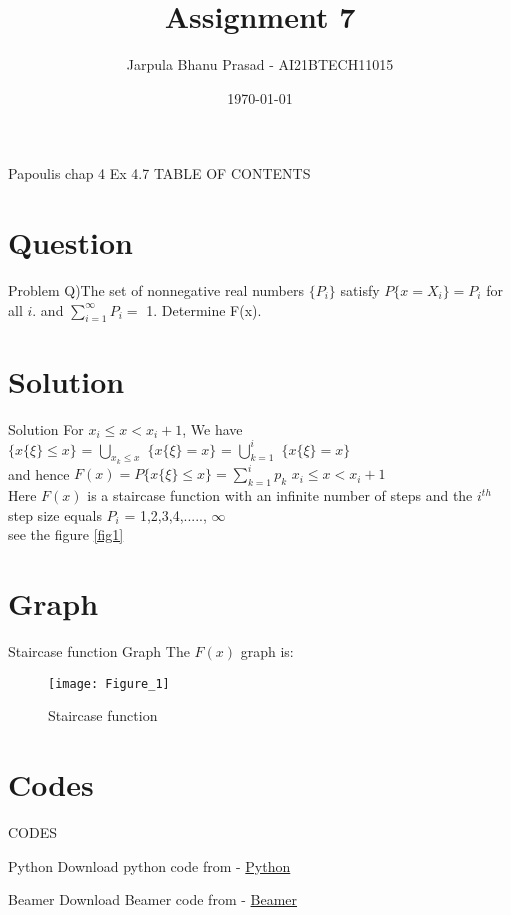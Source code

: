 \documentclass{beamer}
\title{Assignment 7}
\author{Jarpula Bhanu Prasad - AI21BTECH11015}
\date{\today}
\begin{document}
\begin{frame}
    \titlepage 
\end{frame}

\logo{}


\begin{frame}{Papoulis chap 4 Ex 4.7}
TABLE OF CONTENTS
    \tableofcontents
\end{frame}


\section{Question}
\begin{frame}{Problem}
Q)The set of nonnegative real numbers $\{P_i\}$ satisfy $P\{x = X_i\} = P_i$ for all $i$. and
$\sum_{i=1}^\infty P_i =$ 1. Determine F(x). 
\end{frame}

\section{Solution}
\begin{frame}{Solution}
    For $x_i \le x < x_i+1$,  We have \\ $\{x\{\xi\} \le x\}$ = $\bigcup_{x_k \le x}$ $\{x\{\xi\} = x\}$ = $\bigcup_{k=1}^i$ $\{x\{\xi\} = x\}$ \\
    and hence $F(x) = P\{x\{\xi\} \le x\} = \sum_{k=1}^i p_k$ \hspace{5mm} $x_i \le x < x_i+1$ \\
    Here $F(x)$ is a staircase function with an infinite number of steps and the $i^{th}$ step size equals $P_i$ = 1,2,3,4,....., $\infty$ \\
    see the figure \eqref{fig1}
\end{frame}

\section{Graph}
\begin{frame}{Staircase function Graph}
The $F(x)$ graph is:
    \begin{figure}[!ht]
		\centering
		\texttt{[image: Figure\_1]}
		\caption{Staircase function}
		\label{fig1}
	\end{figure}
\end{frame}

\section{Codes}
\begin{frame}{CODES}
    \begin{block}{Python}
         Download python code from - \href{https://github.com/jarpula-Bhanu/Assignment-8/blob/main/code/Graph.py}{Python}
    \end{block}

 \begin{block}{Beamer}
         Download Beamer code from - \href{https://github.com/jarpula-Bhanu/Assignment-8/blob/main/Assignment_8.tex.tex}{Beamer}
    \end{block}
\end{frame} 
\end{document}
